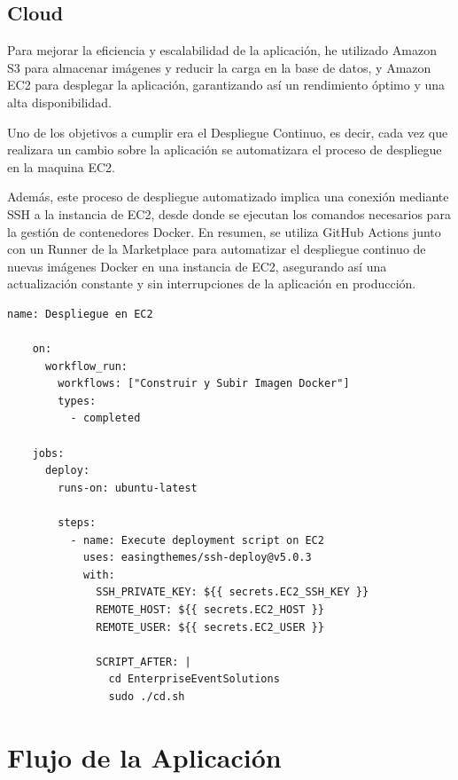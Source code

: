 \subsection{Cloud}
Para mejorar la eficiencia y escalabilidad de la aplicación, he utilizado Amazon S3 para almacenar imágenes y reducir la carga en la base de datos, y 
Amazon EC2 para desplegar la aplicación, garantizando así un rendimiento óptimo y una alta disponibilidad. 

Uno de los objetivos a cumplir era el Despliegue Continuo, es decir, cada vez que realizara un cambio sobre la aplicación se automatizara el proceso 
de despliegue en la maquina EC2. 

Además, este proceso de despliegue automatizado implica una conexión mediante SSH a la instancia de EC2, desde donde se ejecutan los comandos necesarios
para la gestión de contenedores Docker. En resumen, se utiliza GitHub Actions junto con un Runner de la Marketplace para automatizar el despliegue continuo
de nuevas imágenes Docker en una instancia de EC2, asegurando así una actualización constante y sin interrupciones de la aplicación en producción.

\begin{lstlisting}[language=HTML, caption=Action de Automatización CD]
    name: Despliegue en EC2
    
    on:
      workflow_run:
        workflows: ["Construir y Subir Imagen Docker"]
        types:
          - completed
    
    jobs:
      deploy:
        runs-on: ubuntu-latest
        
        steps:
          - name: Execute deployment script on EC2
            uses: easingthemes/ssh-deploy@v5.0.3
            with:
              SSH_PRIVATE_KEY: ${{ secrets.EC2_SSH_KEY }}
              REMOTE_HOST: ${{ secrets.EC2_HOST }}
              REMOTE_USER: ${{ secrets.EC2_USER }}
              
              SCRIPT_AFTER: |
                cd EnterpriseEventSolutions
                sudo ./cd.sh
    \end{lstlisting}
\newpage
\section{Flujo de la Aplicación}


